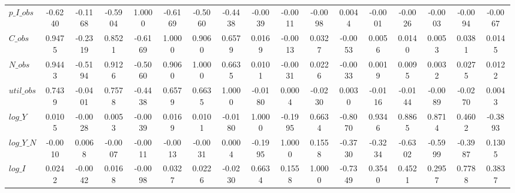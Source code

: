 \begin{center}
\begin{longtable}{lcccccccccccccccc}
$p\_I\_obs       $	 & 	           -0.6240	 & 	           -0.1168	 & 	           -0.5904	 & 	            1.0000	 & 	           -0.6169	 & 	           -0.5060	 & 	           -0.4438	 & 	           -0.0039	 & 	           -0.0011	 & 	           -0.0098	 & 	            0.0044	 & 	           -0.0001	 & 	           -0.0026	 & 	           -0.0003	 & 	           -0.0094	 & 	           -0.0067 \\ 
$C\_obs          $	 & 	            0.9475	 & 	           -0.2319	 & 	            0.8521	 & 	           -0.6169	 & 	            1.0000	 & 	            0.9060	 & 	            0.6579	 & 	            0.0169	 & 	           -0.0013	 & 	            0.0327	 & 	           -0.0053	 & 	            0.0056	 & 	            0.0140	 & 	            0.0053	 & 	            0.0381	 & 	            0.0145 \\ 
$N\_obs          $	 & 	            0.9443	 & 	           -0.5194	 & 	            0.9126	 & 	           -0.5060	 & 	            0.9060	 & 	            1.0000	 & 	            0.6635	 & 	            0.0101	 & 	           -0.0031	 & 	            0.0226	 & 	           -0.0033	 & 	            0.0019	 & 	            0.0095	 & 	            0.0032	 & 	            0.0275	 & 	            0.0122 \\ 
$util\_obs       $	 & 	            0.7439	 & 	           -0.0401	 & 	            0.7578	 & 	           -0.4438	 & 	            0.6579	 & 	            0.6635	 & 	            1.0000	 & 	           -0.0180	 & 	            0.0004	 & 	           -0.0230	 & 	            0.0030	 & 	           -0.0116	 & 	           -0.0144	 & 	           -0.0089	 & 	           -0.0270	 & 	            0.0043 \\ 
$log\_Y          $	 & 	            0.0105	 & 	           -0.0028	 & 	            0.0053	 & 	           -0.0039	 & 	            0.0169	 & 	            0.0101	 & 	           -0.0180	 & 	            1.0000	 & 	           -0.1995	 & 	            0.6634	 & 	           -0.8070	 & 	            0.9346	 & 	            0.8865	 & 	            0.8714	 & 	            0.4602	 & 	           -0.3893 \\ 
$log\_Y\_N       $	 & 	           -0.0010	 & 	            0.0068	 & 	           -0.0007	 & 	           -0.0011	 & 	           -0.0013	 & 	           -0.0031	 & 	            0.0004	 & 	           -0.1995	 & 	            1.0000	 & 	            0.1558	 & 	           -0.3730	 & 	           -0.3234	 & 	           -0.6302	 & 	           -0.5999	 & 	           -0.3987	 & 	            0.1305 \\ 
$log\_I          $	 & 	            0.0242	 & 	           -0.0042	 & 	            0.0168	 & 	           -0.0098	 & 	            0.0327	 & 	            0.0226	 & 	           -0.0230	 & 	            0.6634	 & 	            0.1558	 & 	            1.0000	 & 	           -0.7349	 & 	            0.3540	 & 	            0.4521	 & 	            0.2957	 & 	            0.7788	 & 	            0.3837 \\ 

\end{longtable}
\end{center}
